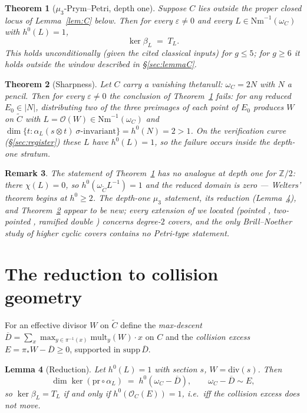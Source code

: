 \documentclass[11pt]{article}
\newtheorem{theorem}{Theorem}[section]
\newtheorem{lemma}[theorem]{Lemma}
\newtheorem{remark}[theorem]{Remark}
\newcommand{\Nm}{\mathrm{Nm}}
\newcommand{\Dbar}{\overline{D}}
\newcommand{\OO}{\mathcal{O}}
\begin{document}
\begin{theorem}[$\mu_3$-Prym--Petri, depth one]\label{thm:main}
Suppose $C$ lies outside the proper closed locus of Lemma~\ref{lem:C} below.  Then
for every $\varepsilon\neq0$ and every $L\in\Nm^{-1}(\omega_C)$ with $h^0(L)=1$,
\[ \ker\beta_L \;=\; T_L . \]
This holds unconditionally (given the cited classical inputs) for $g\le 5$; for
$g\ge6$ it holds outside the window described in \S\ref{sec:lemmaC}.
\end{theorem}

\begin{theorem}[Sharpness]\label{thm:sharp}
Let $C$ carry a vanishing thetanull: $\omega_C=2N$ with $N$ a pencil.  Then for
every $\varepsilon\neq0$ the conclusion of Theorem~\ref{thm:main} fails: for any
reduced $E_0\in|N|$, distributing two of the three preimages of each point of
$E_0$ produces $W$ on $\widetilde C$ with $L=\OO(W)\in\Nm^{-1}(\omega_C)$ and
$\dim\{t: \alpha_L(s\otimes t)\ \sigma\text{-invariant}\}=h^0(N)=2>1$.
On the verification curve (\S\ref{sec:register}) these $L$ have $h^0(L)=1$, so the
failure occurs inside the depth-one stratum.
\end{theorem}

\begin{remark}
The statement of Theorem~\ref{thm:main} has no analogue at depth one for
$\mathbb{Z}/2$: there $\chi(L)=0$, so $h^0(\omega_{\widetilde C}L^{-1})=1$ and the
reduced domain is zero --- Welters' theorem \cite{welters} begins at $h^0\ge2$.
The depth-one $\mu_3$ statement, its reduction (Lemma~\ref{lem:A}), and
Theorem~\ref{thm:sharp} appear to be new; every extension of \cite{welters} we
located (pointed \cite{tarasca}, two-pointed \cite{jeon}, ramified double
\cite{bud}) concerns degree-$2$ covers, and the only Brill--Noether study of higher
cyclic covers \cite{schwarz} contains no Petri-type statement.
\end{remark}

\section{The reduction to collision geometry}

For an effective divisor $W$ on $\widetilde C$ define the \emph{max-descent}
$\Dbar=\sum_x \max_{y\in\pi^{-1}(x)}\mathrm{mult}_y(W)\cdot x$ on $C$ and the
\emph{collision excess} $E=\pi_*W-\Dbar\ge0$, supported in $\mathrm{supp}\,\Dbar$.

\begin{lemma}[Reduction]\label{lem:A}
Let $h^0(L)=1$ with section $s$, $W=\mathrm{div}(s)$.  Then
\[
\dim\ker(\mathrm{pr}\circ\alpha_L)\;=\;h^0(\omega_C-\Dbar),
\qquad \omega_C-\Dbar\sim E,
\]
so $\ker\beta_L= T_L$ if and only if $h^0(\OO_C(E))=1$, i.e.\ iff the collision
excess does not move.
\end{lemma}
\end{document}
